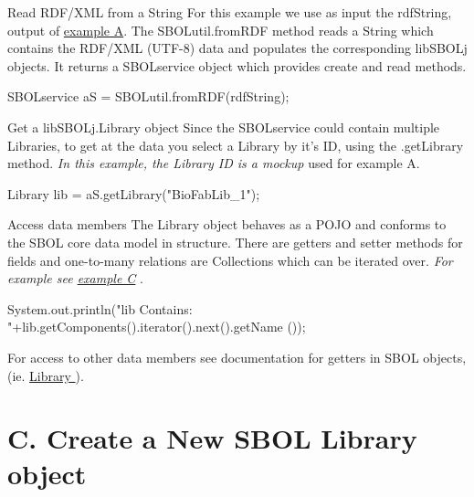\begin{DoxyEnumerate}
\item \begin{DoxyParagraph}{Read RDF/XML from a String}
For this example we use as input the rdfString, output of \hyperlink{tutorial_A}{example A}. The SBOLutil.fromRDF method reads a String which contains the RDF/XML (UTF-\/8) data and populates the corresponding libSBOLj objects. It returns a SBOLservice object which provides create and read methods. 
\begin{DoxyCode}
SBOLservice aS = SBOLutil.fromRDF(rdfString);
\end{DoxyCode}

\end{DoxyParagraph}

\item \begin{DoxyParagraph}{Get a libSBOLj.Library object}
Since the SBOLservice could contain multiple Libraries, to get at the data you select a Library by it's ID, using the .getLibrary method. {\itshape In this example, the Library ID is a mockup\/} used for example A. 
\begin{DoxyCode}
Library lib = aS.getLibrary("BioFabLib_1");
\end{DoxyCode}

\end{DoxyParagraph}

\item \begin{DoxyParagraph}{Access data members}
The Library object behaves as a POJO and conforms to the SBOL core data model in structure. There are getters and setter methods for fields and one-\/to-\/many relations are Collections which can be iterated over. {\itshape For example see \hyperlink{tutorial_C}{example C} \/}. 
\begin{DoxyCode}
System.out.println("lib Contains: "+lib.getComponents().iterator().next().getName
      ());
\end{DoxyCode}

\end{DoxyParagraph}
For access to other data members see documentation for getters in SBOL objects, (ie. \hyperlink{classorg_1_1sbolstandard_1_1lib_s_b_o_lj_1_1_library}{Library }).
\end{DoxyEnumerate}



 \hypertarget{tutorial_C}{}\section{C. Create a New SBOL Library object}\label{tutorial_C}

